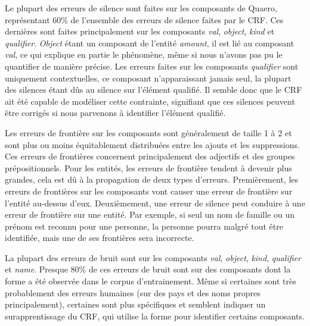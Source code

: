 \documentclass[PhD-Yoann-Dupont.tex]{subfiles}
\begin{document}
Le plupart des erreurs de silence sont faites sur les composants de Quaero, représentant 60\% de l'ensemble des erreurs de silence faites par le CRF. Ces dernières sont faites principalement sur les composants \emph{val}, \emph{object}, \emph{kind} et \emph{qualifier}. \emph{Object} étant un composant de l'entité \emph{amount}, il est lié au composant \emph{val}, ce qui explique en partie le phénomène, même si nous n'avons pas pu le quantifier de manière précise. Les erreurs faites sur les composants \emph{qualifier} sont uniquement contextuelles, ce composant n'apparaissant jamais seul, la plupart des silences étant dûs au silence sur l'élément qualifié. Il semble donc que le CRF ait été capable de modéliser cette contrainte, signifiant que ces silences peuvent être corrigés si nous parvenons à identifier l'élément qualifié.

Les erreurs de frontière sur les composants sont généralement de taille 1 à 2 et sont plus ou moins équitablement distribuées entre les ajouts et les suppressions. Ces erreurs de frontières concernent principalement des adjectifs et des groupes prépositionnels. Pour les entités, les erreurs de frontière tendent à devenir plus grandes, cela est dû à la propagation de deux types d'erreurs. Premièrement, les erreurs de frontières sur les composants vont causer une erreur de frontière sur l'entité au-dessus d'eux. Deuxièmement, une erreur de silence peut conduire à une erreur de frontière sur une entité. Par exemple, si seul un nom de famille ou un prénom est reconnu pour une personne, la personne pourra malgré tout être identifiée, mais une de ses frontières sera incorrecte.

La plupart des erreurs de bruit sont sur les composants \emph{val}, \emph{object}, \emph{kind}, \emph{qualifier} et \emph{name}. Presque 80\% de ces erreurs de bruit sont sur des composants dont la forme a été observée dans le corpus d'entrainement. Même si certaines sont très probablement des erreurs humaines (sur des pays et des noms propres principalement), certaines sont plus spécifiques et semblent indiquer un surapprentissage du CRF, qui utilise la forme pour identifier certains composants.
\end{document}
